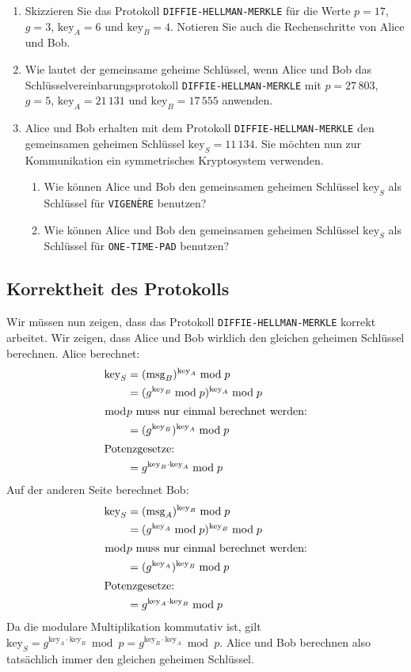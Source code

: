 \begin{enumerate}
	\item Skizzieren Sie das Protokoll \texttt{DIFFIE-HELLMAN-MERKLE} für die Werte $p = 17$, $g = 3$, $\text{key}_A = 6$ und $\text{key}_B = 4$. Notieren Sie auch die Rechenschritte von Alice und Bob.
	\item Wie lautet der gemeinsame geheime Schlüssel, wenn Alice und Bob das Schlüsselvereinbarungsprotokoll \texttt{DIFFIE-HELLMAN-MERKLE} mit $p = 27\,803$, $g = 5$, $\text{key}_A = 21\,131$ und $\text{key}_B = 17\,555$ anwenden.
	\item Alice und Bob erhalten mit dem Protokoll \texttt{DIFFIE-HELLMAN-MERKLE} den gemeinsamen geheimen Schlüssel $\text{key}_S = 11\,134$. Sie möchten nun zur Kommunikation ein symmetrisches Kryptosystem verwenden.
	\begin{enumerate}
		\item Wie können Alice und Bob den gemeinsamen geheimen Schlüssel $\text{key}_S$ als Schlüssel für \texttt{VIGENÈRE} benutzen?
		\item Wie können Alice und Bob den gemeinsamen geheimen Schlüssel $\text{key}_S$ als Schlüssel für \texttt{ONE-TIME-PAD} benutzen?
	\end{enumerate}
\end{enumerate}

\subsection{Korrektheit des Protokolls}

Wir müssen nun zeigen, dass das Protokoll \texttt{DIFFIE-HELLMAN-MERKLE} korrekt arbeitet. Wir zeigen, dass Alice und Bob wirklich den gleichen geheimen Schlüssel berechnen. Alice berechnet:
\begin{align*}
	\text{key}_S	& = (\text{msg}_B)^{\text{key}_A} \bmod p \\
					& = (g^{\text{key}_B} \bmod p)^{\text{key}_A} \bmod p \\
					\shortintertext{\centering $\bmod p$ muss nur einmal berechnet werden:}
					& = (g^{\text{key}_B})^{\text{key}_A} \bmod p \\
										\shortintertext{\centering Potenzgesetze:}
					& = g^{\text{key}_B \cdot \text{key}_A} \bmod p
\end{align*}
Auf der anderen Seite berechnet Bob:
\begin{align*}
	\text{key}_S	& = (\text{msg}_A)^{\text{key}_B} \bmod p \\
					& = (g^{\text{key}_A} \bmod p)^{\text{key}_B} \bmod p \\
					\shortintertext{\centering $\bmod p$ muss nur einmal berechnet werden:}
					& = (g^{\text{key}_A})^{\text{key}_B} \bmod p \\
										\shortintertext{\centering Potenzgesetze:}
					& = g^{\text{key}_A \cdot \text{key}_B} \bmod p
\end{align*}
Da die modulare Multiplikation kommutativ ist, gilt $\text{key}_S = g^{\text{key}_A \cdot \text{key}_B} \bmod p = g^{\text{key}_B \cdot \text{key}_A} \bmod p$. Alice und Bob berechnen also tatsächlich immer den gleichen geheimen Schlüssel. 

